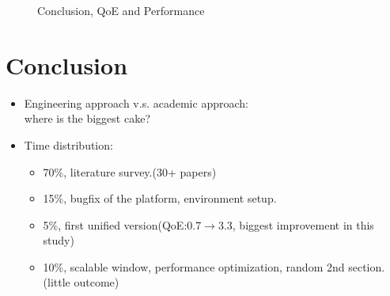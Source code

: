 \documentclass[11pt,a4paper]{article}
\begin{document}
\begin{figure}
	\caption{Conclusion, QoE and Performance}
\end{figure}



\section{Conclusion}

	\begin{itemize}
		\item Engineering approach v.s. academic approach:\\
		where is the biggest cake? 
		\item Time distribution:
			\begin{itemize}
				\item 70\%, literature survey.(30+ papers) 
				\item 15\%, bugfix of the platform, environment setup. 
				\item 5\%, first unified version(QoE:0.7$\rightarrow$3.3, 
				biggest improvement in this study)
				\item 10\%, scalable window, performance optimization, random 
				2nd section. (little outcome)
			\end{itemize}
	\end{itemize}
\end{document}
